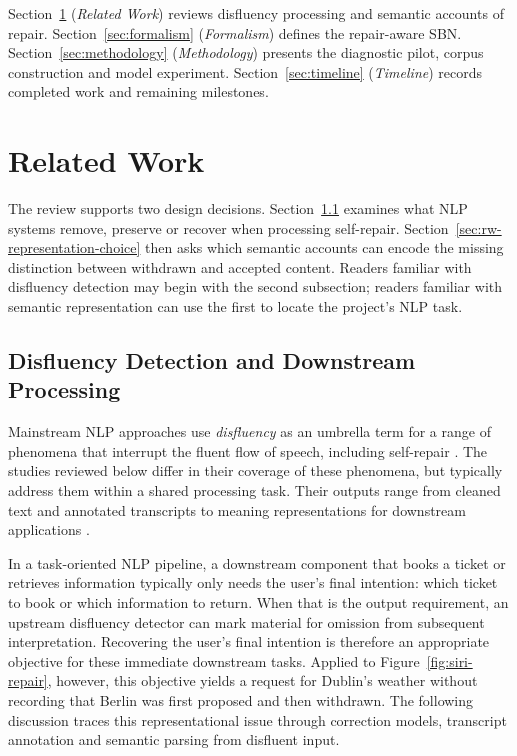 \documentclass{article}
\begin{document}

Section~\ref{sec:related-work} (\emph{Related Work}) reviews disfluency
processing and semantic accounts of repair. Section~\ref{sec:formalism}
(\emph{Formalism}) defines the repair-aware SBN. Section~\ref{sec:methodology}
(\emph{Methodology}) presents the diagnostic pilot, corpus construction and
model experiment. Section~\ref{sec:timeline} (\emph{Timeline}) records
completed work and remaining milestones.

\section{Related Work}
\label{sec:related-work}

The review supports two design decisions. Section~\ref{sec:rw-disfluency}
examines what NLP systems remove, preserve or recover when processing
self-repair. Section~\ref{sec:rw-representation-choice} then asks which
semantic accounts can encode the missing distinction between withdrawn and
accepted content. Readers familiar with disfluency detection may begin with
the second subsection; readers familiar with semantic representation can use
the first to locate the project's NLP task.

\subsection{Disfluency Detection and Downstream Processing}
\label{sec:rw-disfluency}

Mainstream NLP approaches use \emph{disfluency} as an umbrella term for a
range of phenomena that interrupt the fluent flow of speech, including
self-repair
\citep{shribergPreliminariesTheorySpeech1994,senSemanticParsingDisfluent2021}.
The studies reviewed below differ in their coverage of these phenomena, but
typically address them within a shared processing task. Their outputs range
from cleaned text and annotated transcripts to meaning representations for
downstream applications
\citep{johnsonTAGbasedNoisychannelModel2004,futamiStreamingJointSpeech2023,senSemanticParsingDisfluent2021}.

In a task-oriented NLP pipeline, a downstream component that books a ticket
or retrieves information typically only needs the user's final intention: which
ticket to book or which information to return. When that is the output
requirement, an upstream disfluency detector can mark material for omission
from subsequent interpretation. Recovering the user's
final intention is therefore an appropriate objective for these immediate
downstream tasks. Applied to Figure~\ref{fig:siri-repair}, however, this
objective yields a request for Dublin's weather without recording that Berlin
was first proposed and then withdrawn. The following discussion traces this
representational issue through correction models, transcript annotation and
semantic parsing from disfluent input.
\end{document}
